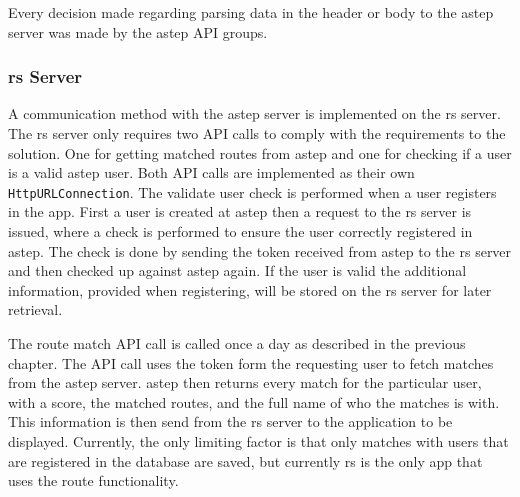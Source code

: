 Every decision made regarding parsing data in the header or body to the \gls{astep} server was made by the \gls{astep} API groups.

\subsubsection{\gls{rs} Server}
A communication method with the \gls{astep} server is implemented on the \gls{rs} server.
The \gls{rs} server only requires two API calls to comply with the requirements to the solution.
One for getting matched routes from \gls{astep} and one for checking if a user is a valid \gls{astep} user.
Both API calls are implemented as their own \texttt{HttpURLConnection}.
The validate user check is performed when a user registers in the app. 
First a user is created at \gls{astep} then a request to the \gls{rs} server is issued, where a check is performed to ensure the user correctly registered in \gls{astep}.
The check is done by sending the token received from \gls{astep} to the \gls{rs} server and then checked up against \gls{astep} again.
If the user is valid the additional information, provided when registering, will be stored on the \gls{rs} server for later retrieval. 

The route match API call is called once a day as described in the previous chapter.
The API call uses the token form the requesting user to fetch matches from the \gls{astep} server. 
\gls{astep} then returns every match for the particular user, with a score, the matched routes, and the full name of who the matches is with.
This information is then send from the \gls{rs} server to the application to be displayed.
Currently, the only limiting factor is that only matches with users that are registered in the database are saved, but currently \gls{rs} is the only app that uses the route functionality.